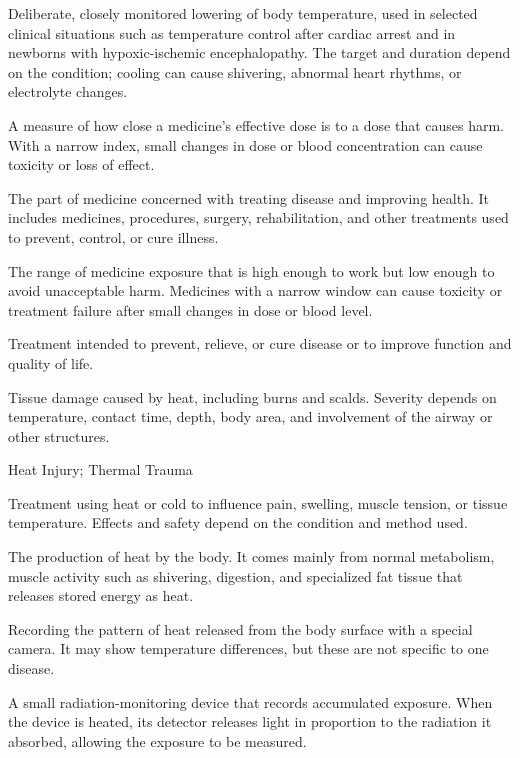  Deliberate, closely monitored lowering of body temperature, used in selected clinical situations such as temperature control after cardiac arrest and in newborns with hypoxic-ischemic encephalopathy. The target and duration depend on the condition; cooling can cause shivering, abnormal heart rhythms, or electrolyte changes.

 A measure of how close a medicine’s effective dose is to a dose that causes harm. With a narrow index, small changes in dose or blood concentration can cause toxicity or loss of effect.

 The part of medicine concerned with treating disease and improving health. It includes medicines, procedures, surgery, rehabilitation, and other treatments used to prevent, control, or cure illness.

 The range of medicine exposure that is high enough to work but low enough to avoid unacceptable harm. Medicines with a narrow window can cause toxicity or treatment failure after small changes in dose or blood level.

 Treatment intended to prevent, relieve, or cure disease or to improve function and quality of life.

 Tissue damage caused by heat, including burns and scalds. Severity depends on temperature, contact time, depth, body area, and involvement of the airway or other structures.

\synonyms
Heat Injury; Thermal Trauma

 Treatment using heat or cold to influence pain, swelling, muscle tension, or tissue temperature. Effects and safety depend on the condition and method used.

 The production of heat by the body. It comes mainly from normal metabolism, muscle activity such as shivering, digestion, and specialized fat tissue that releases stored energy as heat.

 Recording the pattern of heat released from the body surface with a special camera. It may show temperature differences, but these are not specific to one disease.

 A small radiation-monitoring device that records accumulated exposure. When the device is heated, its detector releases light in proportion to the radiation it absorbed, allowing the exposure to be measured.


